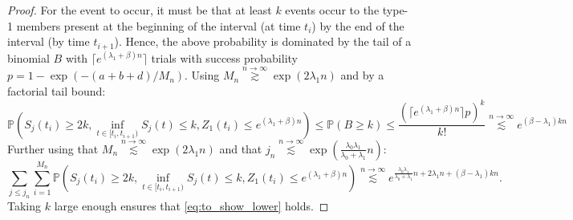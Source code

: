 \documentclass{article}
\numberwithin{equation}{section}
\newcommand{\gsimas}[2]{\overset{{#1}\to {#2}}{\gtrsim}}
\newcommand{\lsimas}[2]{\overset{{#1}\to {#2}}{\lesssim}}
\begin{document}
\begin{proof}
  For the event to occur, it must be that at least $k$ events occur to the type-1 members present at the beginning of the interval (at time $t_i$) by the end of the interval (by time $t_{i+1}$). Hence, the above probability is dominated by the tail of a binomial $B$ with $\lceil e^{(\lambda_1+\beta)n}\rceil$ trials with success probability $p=1-\exp(-(a+b+d)/M_n)$. Using $M_n\gsimas{n}{\infty}\exp(2\lambda_1 n)$ and by a factorial tail bound:
  \[\mathbb{P}\left(S_j(t_i)\geq 2k,\inf_{t\in [t_i,t_{i+1})}S_{j}(t)\leq k,Z_1(t_i)\leq e^{(\lambda_1+\beta)n}\right)\leq \mathbb{P}(B\geq k)\leq \frac{(\lceil e^{(\lambda_1+\beta)n}\rceil p)^k}{k!}\lsimas{n}{\infty}e^{(\beta-\lambda_1)kn}\]
Further using that $M_n\lsimas{n}{\infty}\exp(2\lambda_1 n)$ and that $j_n\lsimas{n}{\infty}\exp(\frac{\lambda_0\lambda_1}{\lambda_0+\lambda_1}n)$:
  \[\sum_{j\leq j_n}\sum_{i=1}^{M_n} \mathbb{P}\left(S_j(t_i)\geq 2k,\inf_{t\in [t_i,t_{i+1})}S_{j}(t)\leq k,Z_1(t_i)\leq e^{(\lambda_1+\beta)n}\right)\lsimas{n}{\infty}e^{\frac{\lambda_0\lambda_1}{\lambda_0+\lambda_1}n+2\lambda_1n+(\beta-\lambda_1)kn}.\]
  Taking $k$ large enough ensures that \ref{eq:to_show_lower} holds.
  
\end{proof}
\end{document}
